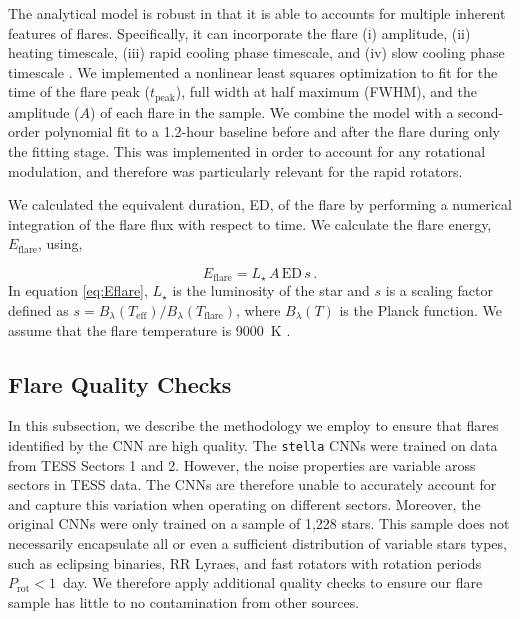\documentclass[twocolumn]{aastex631}
\begin{document}
The analytical model is robust in that it is able to accounts for multiple inherent features of flares. Specifically, it can incorporate the flare (i) amplitude,
 (ii) heating timescale, (iii) rapid cooling phase timescale, and (iv) slow cooling phase
timescale . We implemented a nonlinear least squares
optimization to fit for the time of the flare peak ($t_\textrm{peak}$),
full width at half maximum (FWHM), and the amplitude ($A$) of each flare
in the sample.  We combine the model with a second-order polynomial fit to
a 1.2-hour baseline before and after the flare  during only the fitting stage. This was implemented in order to account for any rotational modulation, and therefore  was particularly relevant for the rapid rotators.


We calculated the equivalent duration, ED, of the flare by performing a numerical integration  of the flare flux with respect to time. We calculate the flare energy, $E_\textrm{flare}$, using,

\begin{equation}\label{eq:Eflare}
    E_\textrm{flare} = L_\star \, A \, \textrm{ED} \, s \, .
\end{equation}
In equation \ref{eq:Eflare}, $L_\star$ is the luminosity of the star and $s$ is a scaling factor defined as $s = B_\lambda(T_\textrm{eff}) / B_\lambda(T_\textrm{flare})$, where $B_\lambda(T)$ is the Planck function. We assume that the flare temperature is 9000~K \citep{}.

\subsection{Flare Quality Checks}\label{subsec2:qualitychecks}

In this subsection, we describe the methodology we employ to ensure that flares identified by the CNN are high quality. The \texttt{stella} CNNs were trained on data from TESS Sectors 1 and 2. However, the noise properties are variable aross sectors in TESS data. The CNNs are therefore unable to accurately
account for and capture  this variation when operating on different sectors. Moreover, the original CNNs were only trained on a sample of 1,228 stars. This sample  does not necessarily encapsulate all or even a sufficient distribution  of variable stars types, such as eclipsing binaries, RR Lyraes, and fast rotators with rotation periods $P_\textrm{rot} < 1$~day. We  therefore apply  additional
quality checks to ensure our flare sample has little to no contamination
from other sources.
\end{document}
